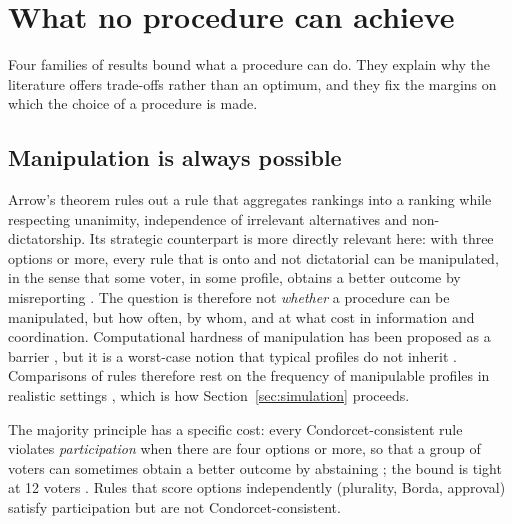 \section{What no procedure can achieve}\label{sec:limits}

Four families of results bound what a procedure can do. They explain why the literature offers
trade-offs rather than an optimum, and they fix the margins on which the choice of a procedure is made.

\subsection{Manipulation is always possible}

Arrow's theorem \citep{Arrow1951} rules out a rule that aggregates rankings into a ranking while
respecting unanimity, independence of irrelevant alternatives and non-dictatorship. Its strategic
counterpart is more directly relevant here: with three options or more, every rule that is onto and
not dictatorial can be manipulated, in the sense that some voter, in some profile, obtains a better
outcome by misreporting \citep{Gibbard1973,Satterthwaite1975}. The question is therefore not
\emph{whether} a procedure can be manipulated, but how often, by whom, and at what cost in
information and coordination. Computational hardness of manipulation has been proposed as a barrier
\citep{BartholdiToveyTrick1989manip}, but it is a worst-case notion that typical profiles do not
inherit \citep{FaliszewskiProcaccia2010}. Comparisons of rules therefore rest on the frequency of
manipulable profiles in realistic settings \citep{GreenArmytageTidemanCosman2016}, which is how
Section~\ref{sec:simulation} proceeds.

The majority principle has a specific cost: every Condorcet-consistent rule violates
\emph{participation} when there are four options or more, so that a group of voters can sometimes obtain
a better outcome by abstaining \citep[the no-show paradox,][]{Moulin1988noshow}; the bound is tight at 12
voters \citep{BrandtGeistPeters2017}. Rules that score options independently (plurality, Borda,
approval) satisfy participation but are not Condorcet-consistent.

